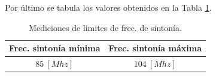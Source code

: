       Por último se tabula los valores obtenidos en la Tabla \ref{tab:MedFrecSinto}.

        \begin{table}[H]
          \small
          \centering
          \begin{tabular}{c c}
              \toprule
              \textbf{Frec. sintonía mínima} &  \textbf{Frec. sintonía máxima} \\ 
              \midrule
              \(85~[Mhz]\)   &   \(104~[Mhz]\) \\ 
              \bottomrule
          \end{tabular}
          \caption{Mediciones de limites de frec. de sintonía.}
          \label{tab:MedFrecSinto}
        \end{table}

        